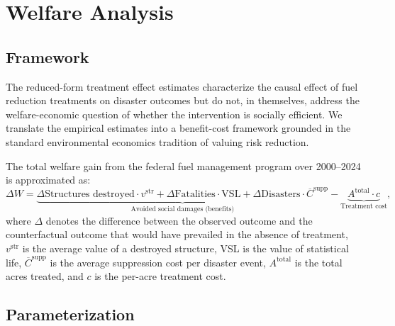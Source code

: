 \documentclass[12pt, letterpaper]{article}
\begin{document}
\section{Welfare Analysis}\label{sec:welfare}

\subsection{Framework}

The reduced-form treatment effect estimates characterize the causal effect of fuel reduction treatments on disaster outcomes but do not, in themselves, address the welfare-economic question of whether the intervention is socially efficient. We translate the empirical estimates into a benefit-cost framework grounded in the standard environmental economics tradition of valuing risk reduction.

The total welfare gain from the federal fuel management program over 2000--2024 is approximated as:
\begin{equation}
\Delta W = \underbrace{\Delta \text{Structures destroyed} \cdot v^{\text{str}} + \Delta \text{Fatalities} \cdot \text{VSL} + \Delta \text{Disasters} \cdot \overline{C}^{\text{supp}}}_{\text{Avoided social damages (benefits)}} - \underbrace{A^{\text{total}} \cdot c}_{\text{Treatment cost}},
\label{eq:welfare_emp}
\end{equation}
where $\Delta$ denotes the difference between the observed outcome and the counterfactual outcome that would have prevailed in the absence of treatment, $v^{\text{str}}$ is the average value of a destroyed structure, VSL is the value of statistical life, $\overline{C}^{\text{supp}}$ is the average suppression cost per disaster event, $A^{\text{total}}$ is the total acres treated, and $c$ is the per-acre treatment cost.

\subsection{Parameterization}
\end{document}
